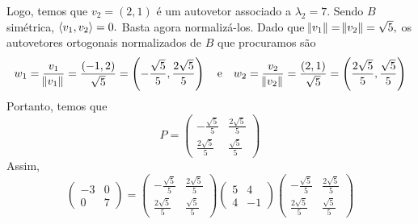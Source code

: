 \documentclass[11pt,a4paper]{article}
\begin{document}
{{Logo, temos que $v_2 = (2,1)$ é um autovetor associado a $\lambda_2 = 7.$ 
Sendo $B$ simétrica, $\left\langle v_1, v_2 \right\rangle = 0.$ Basta agora normalizá-los. Dado que $\norm{v_1} = \norm{v_2} = \sqrt{5},$ os autovetores ortogonais normalizados de $B$ que procuramos são
\[
w_1 = \frac{v_1}{\norm{v_1}} = \frac{(-1,2)}{\sqrt{5}} = \left(-\frac{\sqrt{5}}{5}, \frac{2 \sqrt{5}}{5} \right) \quad \mbox{e} \quad w_2 = \frac{v_2}{\norm{v_2}} = \frac{(2,1)}{\sqrt{5}} = \left(\frac{2\sqrt{5}}{5}, \frac{ \sqrt{5}}{5} \right) 
\]
Portanto, temos que
\[
P = \begin{pmatrix}
-\frac{\sqrt{5}}{5} & \frac{2\sqrt{5}}{5} \\
\frac{2 \sqrt{5}}{5} & \frac{\sqrt{5}}{5} 
\end{pmatrix}
\]
Assim,
\[
 \begin{pmatrix}
-3 & 0 \\
0 & 7
\end{pmatrix} = \begin{pmatrix}
-\frac{\sqrt{5}}{5} & \frac{2\sqrt{5}}{5} \\
\frac{2 \sqrt{5}}{5} & \frac{\sqrt{5}}{5} 
\end{pmatrix}
 \begin{pmatrix}
5 & 4 \\
4 & -1
\end{pmatrix}
\begin{pmatrix}
-\frac{\sqrt{5}}{5} & \frac{2\sqrt{5}}{5} \\
\frac{2 \sqrt{5}}{5} & \frac{\sqrt{5}}{5} 
\end{pmatrix}
\]

}}
\end{document}
